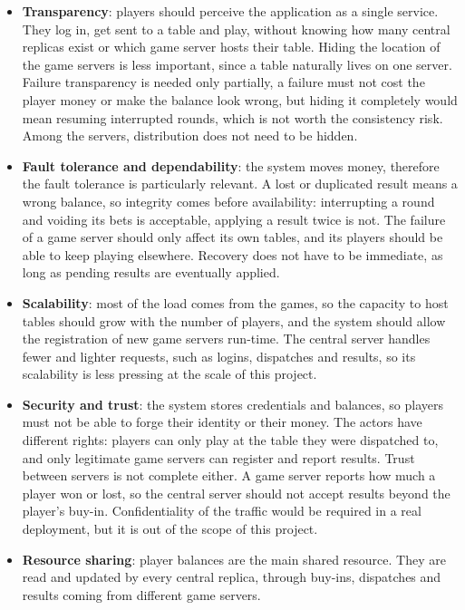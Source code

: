 \documentclass{scrartcl}
\begin{document}
\begin{itemize}
    \item \textbf{Transparency}: players should perceive the application as a single service. They log in, get sent to a table and play, without knowing how many central replicas exist or which game server hosts their table.
    Hiding the location of the game servers is less important, since a table naturally lives on one server.
    Failure transparency is needed only partially, a failure must not cost the player money or make the balance look wrong, but hiding it completely would mean resuming interrupted rounds, which is not worth the consistency risk.
    Among the servers, distribution does not need to be hidden.
    \item \textbf{Fault tolerance and dependability}: the system moves money, therefore the fault tolerance is particularly relevant. A lost or duplicated result means a wrong balance, so integrity comes before availability: interrupting a round and voiding its bets is acceptable, applying a result twice is not.
    The failure of a game server should only affect its own tables, and its players should be able to keep playing elsewhere.
    Recovery does not have to be immediate, as long as pending results are eventually applied.
    \item \textbf{Scalability}: most of the load comes from the games, so the capacity to host tables should grow with the number of players, and the system should allow the registration of new game servers run-time.
    The central server handles fewer and lighter requests, such as logins, dispatches and results, so its scalability is less pressing at the scale of this project.
    \item \textbf{Security and trust}: the system stores credentials and balances, so players must not be able to forge their identity or their money.
    The actors have different rights: players can only play at the table they were dispatched to, and only legitimate game servers can register and report results.
    Trust between servers is not complete either. A game server reports how much a player won or lost, so the central server should not accept results beyond the player's buy-in.
    Confidentiality of the traffic would be required in a real deployment, but it is out of the scope of this project.
    \item \textbf{Resource sharing}: player balances are the main shared resource. They are read and updated by every central replica, through buy-ins, dispatches and results coming from different game servers.

\end{itemize}
\end{document}
